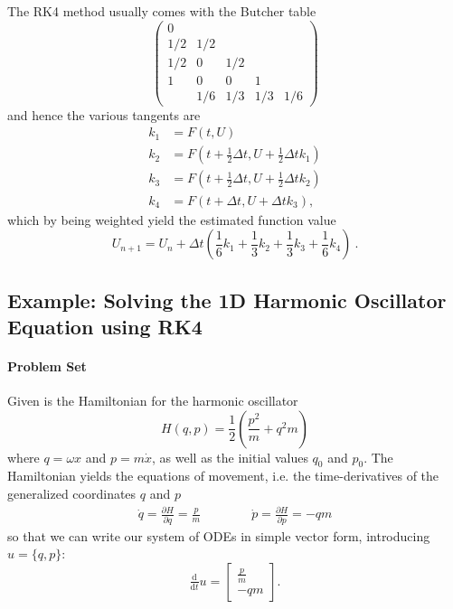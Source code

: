 The RK4 method usually comes with the Butcher table
\begin{equation}
  \begin{pmatrix}
    0 &&&\\
    1/2 & 1/2 & & \\
    1/2 & 0 & 1/2 & \\
    1 & 0 & 0 & 1  \\
    & 1/6 & 1/3 & 1/3 & 1/6
  \end{pmatrix}
\end{equation}
and hence the various tangents are
\begin{align}
  k_1 &= F(t, U) \\
  k_2 &= F(t + \frac{1}{2} \Delta t, U + \frac{1}{2} \Delta t k_1) \\
  k_3 &= F(t + \frac{1}{2} \Delta t, U + \frac{1}{2} \Delta t k_2 ) \\
  k_4 &= F(t + \Delta t, U + \Delta t k_3),
\end{align}
which by being weighted yield the estimated function value
\begin{equation}
  U_{n+1} = U_n + \Delta t \left(\frac{1}{6} k_1 + \frac{1}{3} k_2 + \frac{1}{3} k_3 + \frac{1}{6} k_4 \right)~.
\end{equation}

\subsection{Example: Solving the 1D Harmonic Oscillator Equation using RK4}

\paragraph{Problem Set}
Given is the Hamiltonian for the harmonic oscillator
\begin{equation}
  H(q,p) = \frac{1}{2} \left(\frac{p^2}{m} + q^2m \right)
\end{equation}
where $q = \omega x$ and $p = m \dot{x}$, as well as the initial values $q_0$ and $p_0$. The Hamiltonian yields the equations of movement, i.e. the time-derivatives of the generalized coordinates $q$ and $p$
\begin{align}
  \dot{q} = \frac{\partial H}{\partial q} = \frac{p}{m} \qquad \qquad
  \dot{p} = \frac{\partial H}{\partial p} = -q m
\end{align}
so that we can write our system of ODEs in simple vector form, introducing $u = \{q,p\}$:
\begin{equation}
  \tfrac{\mathrm{d}}{\mathrm{d}t} u =
  \begin{bmatrix} \frac{p}{m} \\ - q m
  \end{bmatrix}.
  \label{eq:dudt}
\end{equation}

